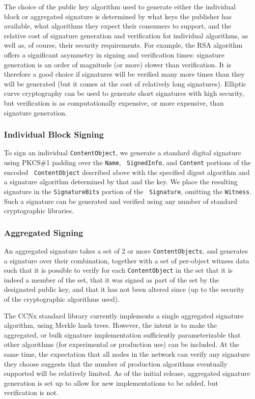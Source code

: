 The choice of the public key algorithm used to generate either the
individual block or aggregated signature is determined by what keys
the publisher has available, what algorithms they expect their
consumers to support, and the relative cost of signature generation
and verification for individual algorithms, as well as, of course,
their security requirements. For example, the RSA algorithm offers a
significant asymmetry in signing and verification times: signature
generation is an order of magnitude (or more) slower than
verification. It is therefore a good choice if signatures will be
verified many more times than they will be generated (but it comes at
the cost of relatively long signatures). Elliptic curve cryptography
can be used to generate short signatures with high security, but
verification is as computationally expensive, or more expensive, than
signature generation.


\subsubsection{Individual Block Signing}

To sign an individual {\tt ContentObject}, we generate a standard
digital signature using PKCS\#1 padding over the {\tt Name}, {\tt
  SignedInfo}, and {\tt Content} portions of the encoded {\tt
  ContentObject} described above with the specified digest algorithm
and a signature algorithm determined by that and the key. We place the
resulting signature in the {\tt SignatureBits} portion of the {\tt
  Signature}, omitting the {\tt Witness}. Such a signature can be
generated and verified using any number of standard cryptographic
libraries.


\subsubsection{Aggregated Signing}

An aggregated signature takes a set of 2 or more {\tt ContentObjects},
and generates a signature over their combination, together with a set
of per-object witness data such that it is possible to verify for each
{\tt ContentObject} in the set that it is indeed a member of the set,
that it was signed as part of the set by the designated public key,
and that it has not been altered since (up to the security of the
cryptographic algorithms used).

The CCNx standard library currently implements a single aggregated
signature algorithm, using Merkle hash trees. However, the intent is
to make the aggregated, or bulk signature implementation sufficiently
parameterizable that other algorithms (for experimental or production
use) can be included. At the same time, the expectation that all nodes
in the network can verify any signature they choose suggests that the
number of production algorithms eventually supported will be
relatively limited. As of the initial release, aggregated signature
generation is set up to allow for new implementations to be added, but
verification is not.

